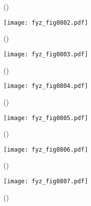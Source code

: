     \begin{figure}[ht!]
      \centering
                     \\
                     \\
      \caption{
               (\cite[s.~748]{Feynman02})}
      \label{fyz:fig0801}
    \end{figure}

    \begin{figure}[ht!] %
      \centering
      \texttt{[image: fyz\_fig0802.pdf]}
      \caption{
               (\cite[s.~707]{Feynman02})}
      \label{fyz:fig0802}
    \end{figure}
    
    \begin{figure}[ht!] %
      \centering
      \texttt{[image: fyz\_fig0803.pdf]}
      \caption{
               (\cite[s.~707]{Feynman02})}
      \label{fyz:fig0803}
    \end{figure}

    \begin{figure}[ht!] %
      \centering
      \texttt{[image: fyz\_fig0804.pdf]}
      \caption{
               (\cite[s.~707]{Feynman02})}
      \label{fyz:fig0804}
    \end{figure}
    
    \begin{figure}[ht!] %
      \centering
      \texttt{[image: fyz\_fig0805.pdf]}
      \caption{
               (\cite[s.~707]{Feynman02})}
      \label{fyz:fig0805}
    \end{figure}


    \begin{figure}[ht!] %
      \centering
      \texttt{[image: fyz\_fig0806.pdf]}
      \caption{
               (\cite[s.~707]{Feynman02})}
      \label{fyz:fig0806}
    \end{figure}

    \begin{figure}[ht!] %
      \centering
      \texttt{[image: fyz\_fig0807.pdf]}
      \caption{
               (\cite[s.~707]{Feynman02})}
      \label{fyz:fig0807}
    \end{figure}
    
